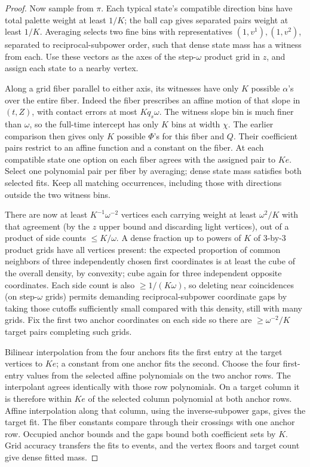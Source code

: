 \begin{proof}
Now sample from \(\pi\). Each typical state's compatible direction
bins have total palette weight at least \(1/K\); the ball cap gives
separated pairs weight at least \(1/K\). Averaging selects two fine
bins with representatives \((1,v^1),(1,v^2)\), separated to
reciprocal-subpower order, such that dense state mass has a witness
from each. Use these vectors as the axes of the step-\(\omega\)
product grid in \(z\), and assign each state to a nearby vertex.

Along a grid fiber parallel to either axis, its witnesses have only
\(K\) possible \(\alpha\)'s over the entire fiber. Indeed the
fiber prescribes an affine motion of that slope in \((t,Z)\), with
contact errors at most \(Kq_s\omega\). The witness slope bin is
much finer than \(\omega\), so the full-time intercept has only
\(K\) bins at width \(\chi\). The earlier comparison then gives
only \(K\) possible \(\Phi\)'s for this fiber and \(Q\). Their
coefficient pairs restrict to an affine function and a constant on
the fiber. At each compatible state one option on each fiber agrees
with the assigned pair to \(Ke\). Select one polynomial pair per
fiber by averaging; dense state mass satisfies both selected fits.
Keep all matching occurrences, including those with directions
outside the two witness bins.

There are now at least \(K^{-1}\omega^{-2}\) vertices each carrying weight at least \(\omega^2/K\) with that agreement (by the \(z\) upper bound and discarding light vertices), out of a product of side counts \(\le K/\omega\). A dense fraction up to powers of \(K\) of \(3\)-by-\(3\) product grids have all vertices present: the expected proportion of common neighbors of three independently chosen first coordinates is at least the cube of the overall density, by convexity; cube again for three independent opposite coordinates. Each side count is also \(\ge 1/(K\omega)\), so deleting near coincidences (on step-\(\omega\) grids) permits demanding reciprocal-subpower coordinate gaps by taking those cutoffs sufficiently small compared with this density, still with many grids. Fix the first two anchor coordinates on each side so there are \(\ge\omega^{-2}/K\) target pairs completing such grids.

Bilinear interpolation from the four anchors fits the first entry
at the target vertices to \(Ke\); a constant from one anchor fits
the second. Choose the four first-entry values from the selected
affine polynomials on the two anchor rows. The interpolant agrees
identically with those row polynomials. On a target column it is
therefore within \(Ke\) of the selected column polynomial at
both anchor rows. Affine interpolation along that column, using
the inverse-subpower gaps, gives the target fit. The fiber constants
compare through their crossings with one anchor row. Occupied
anchor bounds and the gaps bound both coefficient sets by \(K\).
Grid accuracy transfers the fits to events, and the vertex floors
and target count give dense fitted mass.


\end{proof}
